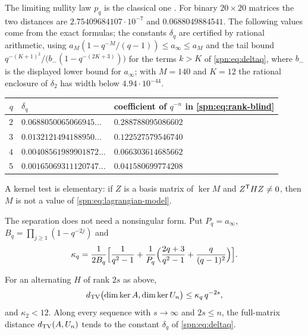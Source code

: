 The limiting nullity law $p_q$ is the classical one \cite{Fulman2015Stein}. For binary
$20\times20$ matrices the two distances are $2.75409684107\cdot10^{-7}$ and
$0.0688049884541$. The following values come from the exact formulas; the constants $\delta_q$
are certified by rational arithmetic, using $a_M(1-q^{-M}/(q-1))\le a_\infty\le a_M$ and the
tail bound $q^{-(K+1)^2}/\bigl(b_-(1-q^{-(2K+3)})\bigr)$ for the terms $k>K$ of
\eqref{spn:eq:deltaq}, where $b_-$ is the displayed lower bound for $a_\infty$; with $M=140$ and
$K=12$ the rational enclosure of $\delta_2$ has width below $4.94\cdot10^{-44}$.
\begin{center}\small
\begin{tabular}{rll}
\toprule
$q$ & $\delta_q$ & coefficient of $q^{-n}$ in \eqref{spn:eq:rank-blind}\\
\midrule
$2$ & $0.0688050065066945\ldots$ & $0.288788095086602$\\
$3$ & $0.0132121494188950\ldots$ & $0.122527579546740$\\
$4$ & $0.00408561989901872\ldots$ & $0.066303614685662$\\
$5$ & $0.00165069311120747\ldots$ & $0.041580699774208$\\
\bottomrule
\end{tabular}
\end{center}
A kernel test is elementary: if $Z$ is a basis matrix of $\ker M$ and $Z^{\mathsf{T}}HZ\ne0$, then
$M$ is not a value of \eqref{spn:eq:lagrangian-model}.

The separation does not need a nonsingular form. Put $P_q=a_\infty$,
$B_q=\prod_{j\ge1}(1-q^{-2j})$ and
\[
 \kappa_q=\frac1{2B_q}\Bigl[\frac1{q^2-1}+\frac1{P_q}\Bigl(\frac{2q+3}{q^2-1}
 +\frac{q}{(q-1)^2}\Bigr)\Bigr].
\]

\begin{theorem}\label{spn:thm:growing-form}
For an alternating $H$ of rank $2s$ as above,
\[
 d_{\mathrm{TV}}\bigl(\dim\ker A,\dim\ker U_n\bigr)\le\kappa_q\,q^{-2s},
\]
and $\kappa_2<12$. Along every sequence with $s\to\infty$ and $2s\le n$, the full-matrix
distance $d_{\mathrm{TV}}(A,U_n)$ tends to the constant $\delta_q$ of \eqref{spn:eq:deltaq}.
\end{theorem}

